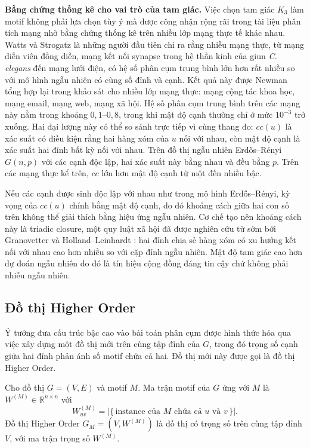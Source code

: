 \textbf{Bằng chứng thống kê cho vai trò của tam giác.} Việc chọn tam giác $K_3$ làm motif không phải lựa chọn tùy ý mà được công nhận rộng rãi trong tài liệu phân tích mạng nhờ bằng chứng thống kê trên nhiều lớp mạng thực tế khác nhau. Watts và Strogatz \cite{watts1998} là những người đầu tiên chỉ ra rằng nhiều mạng thực, từ mạng diễn viên đồng diễn, mạng kết nối synapse trong hệ thần kinh của giun \emph{C. elegans} đến mạng lưới điện, có hệ số phân cụm trung bình lớn hơn rất nhiều so với mô hình ngẫu nhiên có cùng số đỉnh và cạnh. Kết quả này được Newman tổng hợp lại trong khảo sát \cite{newman2003structure} cho nhiều lớp mạng thực: mạng cộng tác khoa học, mạng email, mạng web, mạng xã hội. Hệ số phân cụm trung bình trên các mạng này nằm trong khoảng $0{,}1$--$0{,}8$, trong khi mật độ cạnh thường chỉ ở mức $10^{-3}$ trở xuống. Hai đại lượng này có thể so sánh trực tiếp vì cùng thang đo: $cc(u)$ là xác suất có điều kiện rằng hai hàng xóm của $u$ nối với nhau, còn mật độ cạnh là xác suất hai đỉnh bất kỳ nối với nhau. Trên đồ thị ngẫu nhiên Erdős--Rényi $G(n, p)$ với các cạnh độc lập, hai xác suất này bằng nhau và đều bằng $p$. Trên các mạng thực kể trên, $cc$ lớn hơn mật độ cạnh từ một đến nhiều bậc.

Nếu các cạnh được sinh độc lập với nhau như trong mô hình Erdős--Rényi, kỳ vọng của $cc(u)$ chính bằng mật độ cạnh, do đó khoảng cách giữa hai con số trên không thể giải thích bằng hiệu ứng ngẫu nhiên. Cơ chế tạo nên khoảng cách này là triadic closure, một quy luật xã hội đã được nghiên cứu từ sớm bởi Granovetter \cite{granovetter1973} và Holland--Leinhardt \cite{holland1971}: hai đỉnh chia sẻ hàng xóm có xu hướng kết nối với nhau cao hơn nhiều so với cặp đỉnh ngẫu nhiên. Mật độ tam giác cao hơn dự đoán ngẫu nhiên do đó là tín hiệu cộng đồng đáng tin cậy chứ không phải nhiễu ngẫu nhiên.


\subsection{Đồ thị Higher Order}
\label{subsec:higher-order-graph}

Ý tưởng đưa cấu trúc bậc cao vào bài toán phân cụm được hình thức hóa qua việc xây dựng một đồ thị mới trên cùng tập đỉnh của $G$, trong đó trọng số cạnh giữa hai đỉnh phản ánh số motif chứa cả hai. Đồ thị mới này được gọi là đồ thị Higher Order.

\begin{definition}
\label{def:motif-matrix}
Cho đồ thị $G = (V, E)$ và motif $M$. Ma trận motif của $G$ ứng với $M$ là $W^{(M)} \in \mathbb{R}^{n \times n}$ với
\[
    W^{(M)}_{uv} = \bigl| \{\, \text{instance của } M \text{ chứa cả } u \text{ và } v \,\} \bigr|.
\]
Đồ thị Higher Order $G_M = (V, W^{(M)})$ là đồ thị có trọng số trên cùng tập đỉnh $V$, với ma trận trọng số $W^{(M)}$.
\end{definition}

